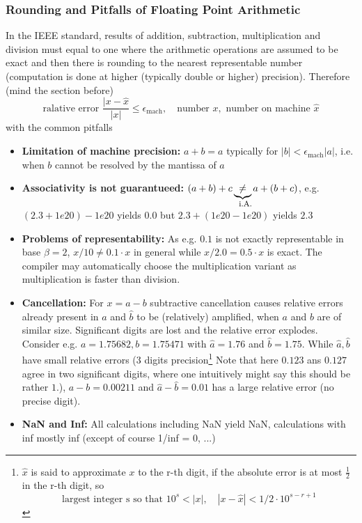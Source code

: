 \subsubsection{Rounding and Pitfalls of Floating Point Arithmetic}
In the IEEE standard, results of addition, subtraction, multiplication and division must equal to
one where the arithmetic operations are assumed to be exact and then there is rounding to the nearest
representable number (computation is done at higher (typically double or higher) precision). Therefore (mind the section before)
\begin{equation}
    \text{ralative error } \frac{|x-\hat{x}}{|x|} \leq \epsilon_{\text{mach}}, \quad \text{number } x, \text{ number on machine } \hat{x}
\end{equation}
with the common pitfalls
\begin{itemize}
    \item \textcolor{red1}{\textbf{Limitation of machine precision:}} $a+b=a$ typically for $|b| < \epsilon_{\text{mach}} |a|$, i.e. when $b$ cannot be resolved by the mantissa of $a$
    \item \textcolor{red1}{\textbf{Associativity is not guarantueed:}} $(a+b)+c \explain{\ne}{i.A.} a+(b+c)$, e.g. $(2.3 + 1e20) - 1e20$ yields $0.0$ but $2.3 + (1e20 - 1e20)$ yields $2.3$
    \item \textcolor{red1}{\textbf{Problems of representability:}} As e.g. $0.1$ is not exactly representable in base $\beta = 2$, $x/10 \ne 0.1 \cdot x$ in general while $x/2.0 = 0.5 \cdot x$ is exact. The compiler may automatically choose the multiplication variant as multiplication is faster than division.
    \item \textcolor{red1}{\textbf{Cancellation:}} For $x = a - b$ subtractive cancellation causes relative errors already present in $\hat{a}$ and $\hat{b}$ to be (relatively) amplified, when $a$ and $b$ are of similar size. Significant digits are lost and the relative error explodes. Consider e.g. $a = 1.75682, b = 1.75471$ with $\hat{a} = 1.76$ and $\hat{b} = 1.75$. While $\hat{a},\hat{b}$ have small relative errors (3 digits precision\footnote{$\hat{x}$ is said to approximate $x$ to the r-th digit, if the absolute error is at most $\frac{1}{2}$ in the r-th digit, so 
    \begin{equation} \text{largest integer s so that } 10^s < |x|, \quad |x-\hat{x}| < 1/2 \cdot 10^{s-r+1} \end{equation}} Note that here $0.123$ ans $0.127$ agree in two significant digits, where one intuitively might say this should be rather $1$.), $a-b = 0.00211$ and $\hat{a} - \hat{b} = 0.01$ has a large relative error (no precise digit).
    \item \textcolor{red1}{\textbf{NaN and Inf:}} All calculations including NaN yield NaN, calculations with inf mostly inf (except of course 1/inf = 0, ...)
\end{itemize}
